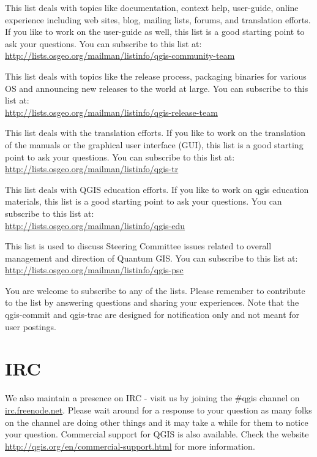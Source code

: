 This list deals with topics like documentation, context help, user-guide,
online experience including web sites, blog, mailing lists, forums, and
translation efforts. If you like to work on the user-guide as well, this list
is a good starting point to ask your questions. You can subscribe to this
list at:\\
\url{http://lists.osgeo.org/mailman/listinfo/qgis-community-team}

This list deals with topics like the release process, packaging binaries for
various OS and announcing new releases to the world at large. You can
subscribe to this list at:\\
\url{http://lists.osgeo.org/mailman/listinfo/qgis-release-team}


This list deals with the translation efforts. If you like to work on the translation 
of the manuals or the graphical user interface (GUI), this list is a good starting 
point to ask your questions. You can subscribe to this list at:\\
\url{http://lists.osgeo.org/mailman/listinfo/qgis-tr}


This list deals with QGIS education efforts. If you like to work on qgis education 
materials, this list is a good starting point to ask your questions. You can 
subscribe to this list at:\\
\url{http://lists.osgeo.org/mailman/listinfo/qgis-edu}

This list is used to discuss Steering Committee issues related to overall
management and direction of Quantum GIS. You can subscribe to this list at:\\
\url{http://lists.osgeo.org/mailman/listinfo/qgis-psc}

You are welcome to subscribe to any of the lists. Please remember to
contribute to the list by answering questions and sharing your experiences.
Note that the qgis-commit and qgis-trac are designed for notification only
and not meant for user postings. 

\section{IRC}
We also maintain a presence on IRC - visit us by joining the \#qgis channel on
\url{irc.freenode.net}. Please wait around for a response to your question as many
folks on the channel are doing other things and it may take a while for them to
notice your question. Commercial support for QGIS is also available.
Check the website \url{http://qgis.org/en/commercial-support.html} for more information.

